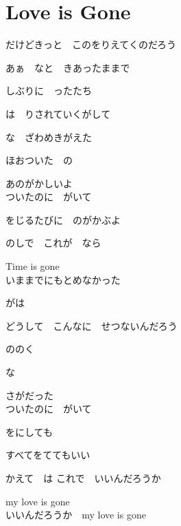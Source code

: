\section{ Love is Gone}
\large{

だけどきっと　このをりえてくのだろう

あぁ　なと　きあったままで

しぶりに　ったたち

は　りされていくがして

な　ざわめきがえた

ほおついた　の

あのがかしいよ
\\

ついたのに　がいて

をじるたびに　のがかぶよ

のしで　これが　なら

Time is gone
\\

いままでにもとめなかった

がは

どうして　こんなに　せつないんだろう

ののく

な

さがだった
\\

ついたのに　がいて

をにしても

すべてをててもいい

かえて　は これで　いいんだろうか

my love is gone
\\

いいんだろうか　my love is gone

}
